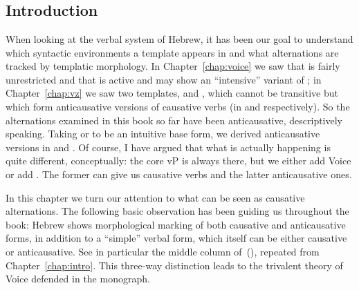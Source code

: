 \chapter{\vd}
\label{chap:vd}

\section{Introduction}
When looking at the verbal system of Hebrew, it has been our goal to understand which syntactic environments a template appears in and what alternations are tracked by templatic morphology. In Chapter~\ref{chap:voice} we saw that {\tkal} is fairly unrestricted and that {\tpie} is active and may show an ``intensive'' variant of {\tkal}; in Chapter~\ref{chap:vz} we saw two templates, {\tnif} and {\thit}, which cannot be transitive but which form anticausative versions of causative verbs (in {\tkal} and {\tpie} respectively). So the alternations examined in this book so far have been anticausative, descriptively speaking. Taking {\tkal} or {\tpie} to be an intuitive base form, we derived anticausative versions in {\tnif} and {\thit}. Of course, I have argued that what is actually happening is quite different, conceptually: the core vP is always there, but we either add Voice or add {\vz}. The former can give us causative verbs and the latter anticausative ones.

In this chapter we turn our attention to what can be seen as causative alternations. The following basic observation has been guiding us throughout the book: Hebrew shows morphological marking of both causative and anticausative forms, in addition to a ``simple'' verbal form, which itself can be either causative or anticausative. See in particular the middle column of~(\nextx), repeated from Chapter~\ref{chap:intro}. This three-way distinction leads to the trivalent theory of Voice defended in the monograph.
\ex \label{vd:ex:alternations-heb}
\xe

